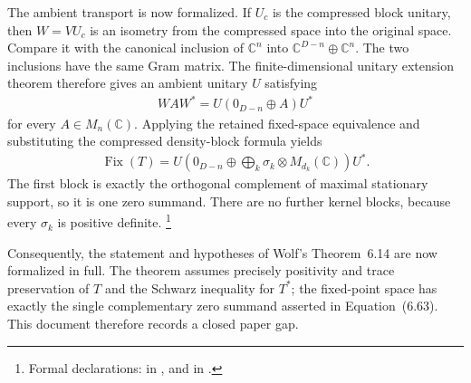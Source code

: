 \documentclass{article}
\begin{document}
The ambient transport is now formalized.  If $U_c$ is the compressed block
unitary, then $W=VU_c$ is an isometry from the compressed space into the
original space.  Compare it with the canonical inclusion of
$\mathbb C^n$ into
$\mathbb C^{D-n}\oplus\mathbb C^n$.  The two inclusions have the same Gram
matrix.  The finite-dimensional unitary extension theorem therefore gives an
ambient unitary $U$ satisfying
\begin{align}
    WAW^*=U(0_{D-n}\oplus A)U^*
\end{align}
for every $A\in M_n(\mathbb C)$.  Applying the retained fixed-space
equivalence and substituting the compressed density-block formula yields
\begin{align}
    \operatorname{Fix}(T)
      =U\left(0_{D-n}\oplus\bigoplus_k
        \sigma_k\otimes M_{d_k}(\mathbb C)\right)U^*.
\end{align}
The first block is exactly the orthogonal complement of maximal stationary
support, so it is one zero summand.  There are no further kernel blocks,
because every $\sigma_k$ is positive definite.
\footnote{Formal declarations:
 in
, and
 in
.}

Consequently, the statement and hypotheses of Wolf's Theorem~6.14 are now
formalized in full.  The theorem assumes precisely positivity and trace
preservation of $T$ and the Schwarz inequality for $T^*$; the fixed-point
space has exactly the single complementary zero summand asserted in
Equation~(6.63).  This document therefore records a closed paper gap.



\end{document}
